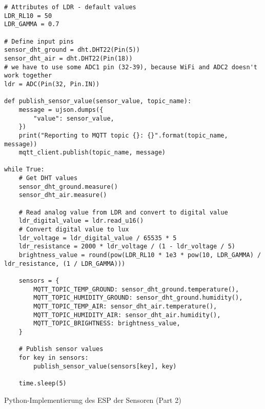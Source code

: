 \begin{listing}[!ht]
\begin{verbatim}
# Attributes of LDR - default values
LDR_RL10 = 50
LDR_GAMMA = 0.7

# Define input pins
sensor_dht_ground = dht.DHT22(Pin(5))
sensor_dht_air = dht.DHT22(Pin(18))
# we have to use some ADC1 pin (32-39), because WiFi and ADC2 doesn't work together
ldr = ADC(Pin(32, Pin.IN))

def publish_sensor_value(sensor_value, topic_name):
    message = ujson.dumps({
        "value": sensor_value,
    })
    print("Reporting to MQTT topic {}: {}".format(topic_name, message))
    mqtt_client.publish(topic_name, message)

while True:
    # Get DHT values
    sensor_dht_ground.measure()
    sensor_dht_air.measure()

    # Read analog value from LDR and convert to digital value
    ldr_digital_value = ldr.read_u16()
    # Convert digital value to lux
    ldr_voltage = ldr_digital_value / 65535 * 5
    ldr_resistance = 2000 * ldr_voltage / (1 - ldr_voltage / 5)
    brightness_value = round(pow(LDR_RL10 * 1e3 * pow(10, LDR_GAMMA) / ldr_resistance, (1 / LDR_GAMMA)))
    
    sensors = {
        MQTT_TOPIC_TEMP_GROUND: sensor_dht_ground.temperature(),
        MQTT_TOPIC_HUMIDITY_GROUND: sensor_dht_ground.humidity(),
        MQTT_TOPIC_TEMP_AIR: sensor_dht_air.temperature(),
        MQTT_TOPIC_HUMIDITY_AIR: sensor_dht_air.humidity(),
        MQTT_TOPIC_BRIGHTNESS: brightness_value,
    }

    # Publish sensor values
    for key in sensors:
        publish_sensor_value(sensors[key], key)
    
    time.sleep(5)
\end{verbatim}
\caption{Python-Implementierung des ESP der Sensoren (Part 2)}
\label{list:wokwi_sensoren2}
\end{listing}

